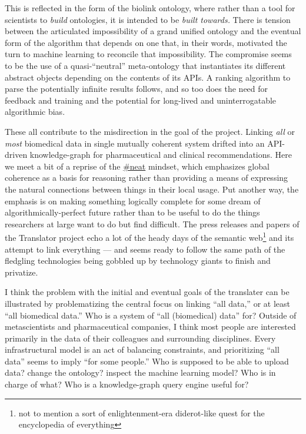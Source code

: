 \documentclass[10pt]{article}
\begin{document}
\begin{multicols}{2}
This is reflected in the form of the biolink ontology, where rather than
a tool for scientists to \emph{build} ontologies, it is intended to be
\emph{built towards.} There is tension between the articulated
impossibility of a grand unified ontology and the eventual form of the
algorithm that depends on one that, in their words, motivated the turn
to machine learning to reconcile that impossibility. The compromise
seems to be the use of a quasi-``neutral'' meta-ontology that
instantiates its different abstract objects depending on the contents of
its APIs. A ranking algorithm to parse the potentially infinite results
follows, and so too does the need for feedback and training and the
potential for long-lived and uninterrogatable algorithmic bias.

These all contribute to the misdirection in the goal of the project.
Linking \emph{all} or \emph{most} biomedical data in single mutually
coherent system drifted into an API-driven knowledge-graph for
pharmaceutical and clinical recommendations. Here we meet a bit of a
reprise of the \protect\hyperlink{neatness-vs-scruffiness}{\#neat}
mindset, which emphasizes global coherence as a basis for reasoning
rather than providing a means of expressing the natural connections
between things in their local usage. Put another way, the emphasis is on
making something logically complete for some dream of
algorithmically-perfect future rather than to be useful to do the things
researchers at large want to do but find difficult. The press releases
and papers of the Translator project echo a lot of the heady days of the
semantic web\footnote{not to mention a sort of enlightenment-era
  diderot-like quest for the encyclopedia of everything} and its attempt
to link everything --- and seems ready to follow the same path of the
fledgling technologies being gobbled up by technology giants to finish
and privatize.

I think the problem with the initial and eventual goals of the
translater can be illustrated by problematizing the central focus on
linking ``all data,'' or at least ``all biomedical data.'' Who is a
system of ``all (biomedical) data'' for? Outside of metascientists and
pharmaceutical companies, I think most people are interested primarily
in the data of their colleagues and surrounding disciplines. Every
infrastructural model is an act of balancing constraints, and
prioritizing ``all data'' seems to imply ``for some people.'' Who is
supposed to be able to upload data? change the ontology? inspect the
machine learning model? Who is in charge of what? Who is a
knowledge-graph query engine useful for?


\end{multicols}
\end{document}
